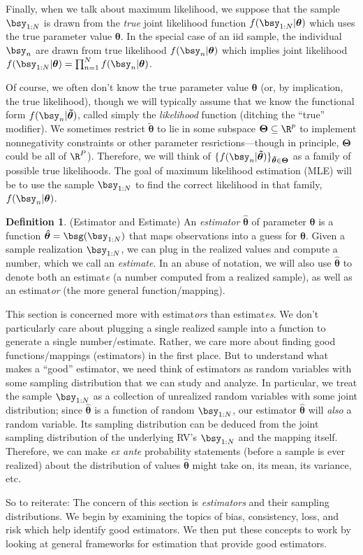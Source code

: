 \documentclass[12pt]{article}
\theoremstyle{plain}
\theoremstyle{definition}
\newtheorem{defn}[thm]{Definition}
\theoremstyle{remark}
\newcommand{\bstheta}{\boldsymbol{\theta}}
\newcommand{\bsTheta}{\boldsymbol{\Theta}}
\newcommand{\bshattheta}{\boldsymbol{\hat{\theta}}}
\newcommand{\bstildetheta}{\boldsymbol{\tilde{\theta}}}
\newcommand{\nN}{_{n=1}^N}
\begin{document}
Finally, when we talk about maximum likelihood, we suppose that the
sample $\bsy_{1:N}$ is drawn from the \emph{true} joint likelihood
function $f(\bsy_{1:N}|\bstheta)$ which uses the true parameter value
$\bstheta$. In the special case of an iid sample, the individual
$\bsy_n$ are drawn from true likelihood $f(\bsy_n|\bstheta)$ which
implies joint likelihood
$f(\bsy_{1:N}|\bstheta)=\prod\nN f(\bsy_n|\bstheta)$.

Of course, we often don't know the true parameter value $\bstheta$ (or,
by implication, the true likelihood), though we will typically assume
that we know the functional form $f(\bsy_n|\bstildetheta)$, called
simply the \emph{likelihood} function (ditching the ``true'' modifier).
We sometimes restrict $\bstildetheta$ to lie in some subspace
$\bsTheta\subseteq\R^p$ to implement nonnegativity constraints or other
parameter resrictions---though in principle, $\bsTheta$ could be all of
$\R^P$). Therefore, we will think of
$\{f(\bsy_n|\bstildetheta)\}_{\bstildetheta\in\bsTheta}$ as a family of
possible true likelihoods. The goal of maximum likelihood estimation
(MLE) will be to use the sample $\bsy_{1:N}$ to find the correct
likelihood in that family, $f(\bsy_n|\bstheta)$.

\begin{defn}(Estimator and Estimate)
An \emph{estimator} $\bshattheta$ of parameter $\bstheta$ is a function
$\bshattheta = \bsg(\bsy_{1:N})$ that maps observations into a guess for
$\bstheta$.
Given a sample realization $\bsy_{1:N}$, we can plug in the realized
values and compute a number, which we call an \emph{estimate}. In an
abuse of notation, we will also use $\bshattheta$ to denote both an
estimat\emph{e} (a number computed from a realized sample), as well as
an estimat\emph{or} (the more general function/mapping).

This section is concerned more with estimat\emph{ors} than
estimat\emph{es}. We don't particularly care about plugging a single
realized sample into a function to generate a single number/estimate.
Rather, we care more about finding good functions/mappings (estimators)
in the first place. But to understand what makes a ``good'' estimator,
we need think of estimators as random variables with some sampling
distribution that we can study and analyze. In particular, we treat the
sample $\bsy_{1:N}$ as a collection of unrealized random variables with
some joint distribution; since $\bshattheta$ is a function of random
$\bsy_{1:N}$, our estimator $\bshattheta$ will \emph{also} a random
variable. Its sampling distribution can be deduced from the joint
sampling distribution of the underlying RV's $\bsy_{1:N}$ and the
mapping itself. Therefore, we can make \emph{ex ante} probability
statements (before a sample is ever realized) about the distribution of
values $\bshattheta$ might take on, its mean, its variance, etc.

So to reiterate: The concern of this section is \emph{estimators} and
their sampling distributions. We begin by examining the topics of bias,
consistency, loss, and risk which help identify good estimators. We then
put these concepts to work by looking at general frameworks for
estimation that provide good estimators.
\end{defn}
\end{document}
